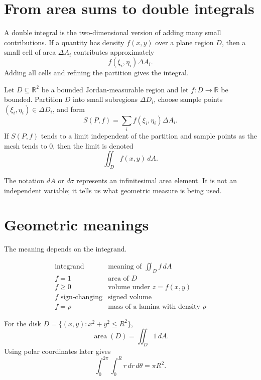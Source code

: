 
\section{From area sums to double integrals}

A double integral is the two-dimensional version of adding many small contributions.  If a quantity has density \(f(x,y)\) over a plane region \(D\), then a small cell of area \(\Delta A_i\) contributes approximately
\[
  f(\xi_i,\eta_i)\Delta A_i.
\]
Adding all cells and refining the partition gives the integral.

\begin{definition}
Let \(D\subseteq \mathbb R^2\) be a bounded Jordan-measurable region and let \(f:D\to\mathbb R\) be bounded.  Partition \(D\) into small subregions \(\Delta D_i\), choose sample points \((\xi_i,\eta_i)\in \Delta D_i\), and form
\[
  S(P,f)=\sum_i f(\xi_i,\eta_i)\Delta A_i.
\]
If \(S(P,f)\) tends to a limit independent of the partition and sample points as the mesh tends to \(0\), then the limit is denoted
\[
  \iint_D f(x,y)\,dA.
\]
\end{definition}

The notation \(dA\) or \(d\sigma\) represents an infinitesimal area element.  It is not an independent variable; it tells us what geometric measure is being used.

\section{Geometric meanings}

The meaning depends on the integrand.

\[
\begin{array}{c|c}
\text{integrand} & \text{meaning of }\iint_D f\,dA\\
\hline
f=1 & \text{area of }D\\
f\ge0 & \text{volume under }z=f(x,y)\\
f\text{ sign-changing} & \text{signed volume}\\
f=\rho & \text{mass of a lamina with density }\rho
\end{array}
\]

\begin{example}
For the disk \(D=\{(x,y):x^2+y^2\le R^2\}\),
\[
  \operatorname{area}(D)=\iint_D 1\,dA.
\]
Using polar coordinates later gives
\[
  \int_0^{2\pi}\int_0^R r\,dr\,d\theta=\pi R^2.
\]
\end{example}

